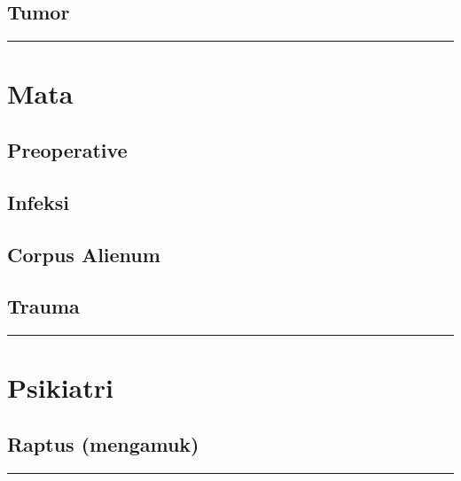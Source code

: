 \documentclass[
]{book}
\begin{document}
\hypertarget{tumor}{%
\subsection{Tumor}\label{tumor}}

\begin{center}\rule{0.5\linewidth}{0.5pt}\end{center}

\hypertarget{mata}{%
\section{Mata}\label{mata}}

\hypertarget{preoperative-2}{%
\subsection{Preoperative}\label{preoperative-2}}

\hypertarget{infeksi-5}{%
\subsection{Infeksi}\label{infeksi-5}}

\hypertarget{corpus-alienum-1}{%
\subsection{Corpus Alienum}\label{corpus-alienum-1}}

\hypertarget{trauma-2}{%
\subsection{Trauma}\label{trauma-2}}

\begin{center}\rule{0.5\linewidth}{0.5pt}\end{center}

\hypertarget{psikiatri}{%
\section{Psikiatri}\label{psikiatri}}

\hypertarget{raptus-mengamuk}{%
\subsection{Raptus (mengamuk)}\label{raptus-mengamuk}}

\begin{center}\rule{0.5\linewidth}{0.5pt}\end{center}
\end{document}
